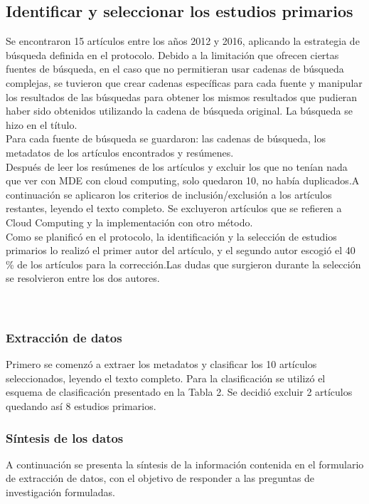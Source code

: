 \documentclass{llncs}
\begin{document}
\subsection{Identificar y seleccionar los estudios primarios}
Se encontraron 15 artículos entre los años 2012 y 2016, aplicando la estrategia de búsqueda definida en el protocolo. Debido a la limitación que ofrecen ciertas fuentes de búsqueda, en el caso que no permitieran usar cadenas de búsqueda complejas, se tuvieron que crear cadenas específicas para cada fuente y manipular los resultados de las búsquedas para obtener los mismos resultados que pudieran haber sido obtenidos utilizando la cadena de búsqueda original. La búsqueda se hizo en el título.\\
Para cada fuente de búsqueda se guardaron: las cadenas de búsqueda, los metadatos de los artículos encontrados y resúmenes.\\
Después de leer los resúmenes de los artículos y excluir los que no tenían nada que ver con MDE con cloud computing, solo quedaron 10, no había duplicados.A continuación se aplicaron los criterios de inclusión/exclusión a los artículos restantes, leyendo el texto completo. Se excluyeron artículos que se refieren a Cloud Computing y la implementación con otro método.\\
Como se planificó en el protocolo, la identificación y la selección de estudios primarios lo realizó el primer autor del artículo, y el segundo autor escogió el 40 \% de los artículos para la corrección.Las dudas que surgieron durante la selección se resolvieron entre los dos autores.\\ \\ \\

\subsubsection{Extracción de datos}
Primero se comenzó a extraer los metadatos y clasificar los 10 artículos seleccionados, leyendo el texto completo. Para la clasificación se utilizó el esquema de clasificación presentado en la Tabla 2. Se decidió excluir 2 artículos quedando así 8 estudios primarios.

\subsubsection{Síntesis de los datos}
A continuación se presenta la síntesis de la información contenida en el formulario de extracción de datos, con el objetivo de responder a las preguntas de investigación formuladas.
\end{document}

